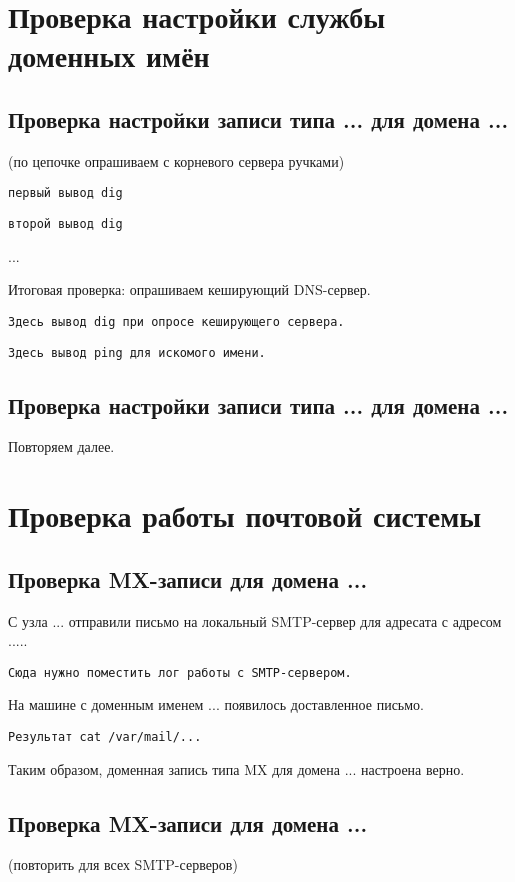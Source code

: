 \documentclass[a4paper,12pt]{article}
\begin{document}
\section{Проверка настройки службы доменных имён}

\subsection{Проверка настройки записи типа ... для домена ...}

(по цепочке опрашиваем с корневого сервера ручками)

\begin{verbatim}
первый вывод dig
\end{verbatim}

\begin{verbatim}
второй вывод dig
\end{verbatim}

...

Итоговая проверка: опрашиваем кеширующий DNS-сервер.

\begin{verbatim}
Здесь вывод dig при опросе кеширующего сервера.
\end{verbatim}

\begin{verbatim}
Здесь вывод ping для искомого имени.
\end{verbatim}

\subsection{Проверка настройки записи типа ... для домена ...}

Повторяем далее.

\section{Проверка работы почтовой системы}

\subsection{Проверка MX-записи для домена ...}

С узла ... отправили письмо на локальный SMTP-сервер для адресата с адресом .....

\begin{verbatim}
Сюда нужно поместить лог работы с SMTP-сервером.
\end{verbatim}

На машине с доменным именем ... появилось доставленное письмо.
\begin{verbatim}
Результат cat /var/mail/...
\end{verbatim}

Таким образом, доменная запись типа MX для домена ... настроена верно.

\subsection{Проверка MX-записи для домена ...}

(повторить для всех SMTP-серверов)
\end{document}

